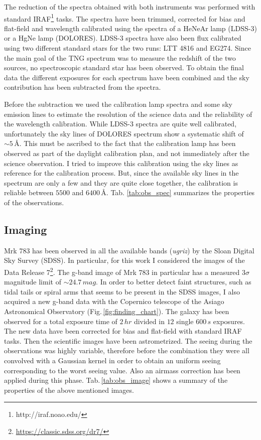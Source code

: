 \documentclass[../thesis.tex]{subfiles}
\begin{document}
The reduction of the spectra obtained with both instruments was performed with standard IRAF\footnote{http://iraf.noao.edu/} tasks.
The spectra have been trimmed, corrected for bias and flat-field and wavelength calibrated using the spectra of a HeNeAr lamp (LDSS-3) or a HgNe lamp (DOLORES).
LDSS-3 spectra have also been flux calibrated using two different standard stars for the two runs: LTT 4816 and EG274.
Since the main goal of the TNG spectrum was to measure the redshift of the two sources, no spectroscopic standard star has been observed.
To obtain the final data the different exposures for each spectrum have been combined and the sky contribution has been subtracted from the spectra.

Before the subtraction we used the calibration lamp spectra and some sky emission lines to estimate the resolution of the science data and the reliability of the wavelength calibration.
While LDSS-3 spectra are quite well calibrated, unfortunately the sky lines of DOLORES spectrum show a systematic shift of $\sim 5\,\si{\angstrom}$.
This must be ascribed to the fact that the calibration lamp has been observed as part of the daylight calibration plan, and not immediately after the science observation.
I tried to improve this calibration using the sky lines as reference for the calibration process.
But, since the available sky lines in the spectrum are only a few and they are quite close together, the calibration is reliable between $5500$ and $6400\,\si{\angstrom}$.
Tab. \ref{tab:obs_spec} summarizes the properties of the observations.

\subsection{Imaging}
\label{sec:obs_ima}

Mrk 783 has been observed in all the available bands (\emph{ugriz}) by the Sloan Digital Sky Survey (SDSS).
In particular, for this work I considered the images of the Data Release 7\footnote{\url{https://classic.sdss.org/dr7/}}.
The g-band image of Mrk 783 in particular has a measured $3\sigma$ magnitude limit of $\sim 24.7\,\si{mag}$.
In order to better detect faint structures, such as tidal tails or spiral arms that seems to be present in the SDSS images, I also acquired a new g-band data with the Copernico telescope of the Asiago Astronomical Observatory (Fig.\,\ref{fig:finding_chart}).
The galaxy has been observed for a total exposure time of $2\,\si{hr}$ divided in $12$ single $600\,\si{s}$ exposures. 
The new data have been corrected for bias and flat-field with standard IRAF tasks.
Then the scientific images have been astrometrized.
The seeing during the observations was highly variable, therefore before the combination they were all convolved with a Gaussian kernel in order to obtain an uniform seeing corresponding to the worst seeing value.
Also an airmass correction has been applied during this phase.
Tab.\,\ref{tab:obs_image} shows a summary of the properties of the above mentioned images.
\end{document}
